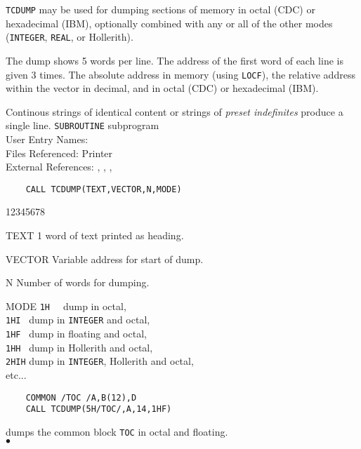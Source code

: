                 
    
          
                
{\tt TCDUMP} may be used for dumping sections of memory in
octal (CDC) or hexadecimal (IBM), optionally combined with any or all
of the other modes ({\tt INTEGER}, {\tt REAL}, or Hollerith).
\par
The dump shows 5 words per line. The address of the first word
of each line is given 3 times. The absolute address in memory (using
{\tt LOCF}), the relative address within the vector in decimal, and in
octal (CDC) or hexadecimal (IBM).
\par
Continous strings of identical content or strings of
{\it preset indefinites} produce a single line.
\Structure
{\tt SUBROUTINE} subprogram \\
User Entry Names: \\
Files Referenced: Printer\\
External References: , ,
, 
\Usage
\begin{verbatim}
    CALL TCDUMP(TEXT,VECTOR,N,MODE)
\end{verbatim}
\begin{DLtt}{12345678}
\item [TEXT] 1 word of text printed as heading.
\item [VECTOR] Variable address for start of dump.
\item [N] Number of words for dumping.
\item [MODE] {\tt 1H\ \ } dump in octal, \\
             {\tt 1HI\ }  dump in {\tt INTEGER} and octal, \\
             {\tt 1HF\ }  dump in floating and octal, \\
             {\tt 1HH\ } dump in Hollerith and octal, \\
             {\tt 2HIH} dump in {\tt INTEGER}, Hollerith and octal, \\
             etc...
\end{DLtt}
\Examples
\begin{verbatim}
    COMMON /TOC /A,B(12),D
    CALL TCDUMP(5H/TOC/,A,14,1HF)
\end{verbatim}
dumps the common block {\tt TOC} in octal and floating.
\\ $\bullet$
